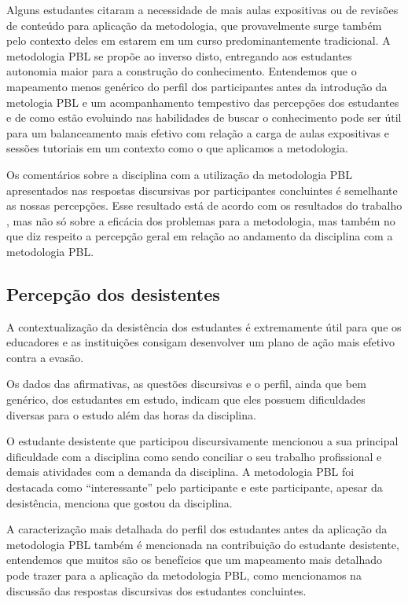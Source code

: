 Alguns estudantes citaram a necessidade de mais aulas
expositivas ou de revisões de conteúdo para aplicação
da metodologia, que provavelmente surge também pelo
contexto deles em estarem em um curso
predominantemente tradicional.
A metodologia \ac{PBL} se propõe ao inverso disto, entregando
aos estudantes autonomia maior para a construção
do conhecimento.
Entendemos que o mapeamento menos genérico do perfil
dos participantes antes da introdução da metologia \ac{PBL}
e um acompanhamento tempestivo das percepções dos estudantes
e de como estão evoluindo nas habilidades de buscar o conhecimento
pode ser útil para um balanceamento mais efetivo com
relação a carga de aulas expositivas e sessões tutoriais
em um contexto como o que aplicamos a metodologia.

Os comentários sobre a disciplina com a utilização da metodologia \ac{PBL}
apresentados nas respostas discursivas por participantes concluintes
é semelhante as nossas percepções.
Esse resultado está de acordo com os resultados do
trabalho \cite{sockalingam2011student}, mas não só sobre a eficácia
dos problemas para a metodologia, mas também no que diz respeito
a percepção geral em relação ao andamento da disciplina
com a metodologia \ac{PBL}.

\subsection{Percepção dos desistentes}

A contextualização da desistência dos estudantes é extremamente útil
para que os educadores e as instituições consigam desenvolver um
plano de ação mais efetivo contra a evasão.

Os dados das afirmativas, as questões discursivas e o perfil,
ainda que bem genérico, dos estudantes em estudo, indicam que
eles possuem dificuldades diversas para o estudo além
das horas da disciplina.

O estudante desistente que participou discursivamente mencionou a sua
principal dificuldade com a disciplina como sendo conciliar o
seu trabalho profissional e demais atividades com
a demanda da disciplina.
A metodologia \ac{PBL} foi destacada como ``interessante''
pelo participante e este participante, apesar da desistência,
menciona que gostou da disciplina.

A caracterização mais detalhada do perfil dos estudantes
antes da aplicação da metodologia \ac{PBL} também é mencionada
na contribuição do estudante desistente, entendemos
que muitos são os benefícios que um mapeamento mais detalhado
pode trazer para a aplicação da metodologia \ac{PBL}, como
mencionamos na discussão das respostas discursivas dos estudantes
concluintes.
